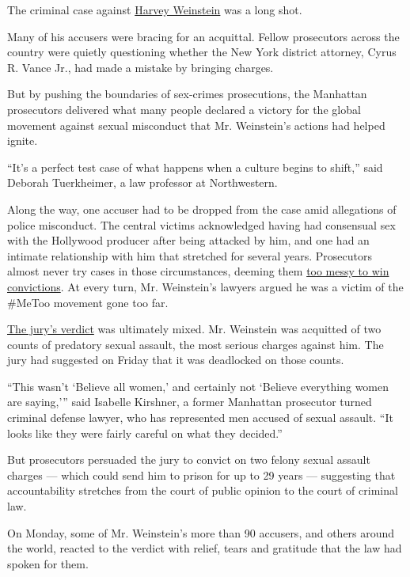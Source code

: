 The criminal case against
\href{https://www.nytimes3xbfgragh.onion/2020/02/25/us/politics/trump-weinstein-verdict.html}{Harvey
Weinstein} was a long shot.

Many of his accusers were bracing for an acquittal. Fellow prosecutors
across the country were quietly questioning whether the New York
district attorney, Cyrus R. Vance Jr., had made a mistake by bringing
charges.

But by pushing the boundaries of sex-crimes prosecutions, the Manhattan
prosecutors delivered what many people declared a victory for the global
movement against sexual misconduct that Mr. Weinstein's actions had
helped ignite.

``It's a perfect test case of what happens when a culture begins to
shift,'' said Deborah Tuerkheimer, a law professor at Northwestern.

Along the way, one accuser had to be dropped from the case amid
allegations of police misconduct. The central victims acknowledged
having had consensual sex with the Hollywood producer after being
attacked by him, and one had an intimate relationship with him that
stretched for several years. Prosecutors almost never try cases in those
circumstances, deeming them
\href{https://www.nytimes3xbfgragh.onion/2020/02/07/nyregion/harvey-weinstein-trial-consent.html}{too
messy to win convictions}. At every turn, Mr. Weinstein's lawyers argued
he was a victim of the \#MeToo movement gone too far.

\href{https://www.nytimes3xbfgragh.onion/2020/02/24/nyregion/harvey-weinstein-trial-rape-verdict.html}{The
jury's verdict} was ultimately mixed. Mr. Weinstein was acquitted of two
counts of predatory sexual assault, the most serious charges against
him. The jury had suggested on Friday that it was deadlocked on those
counts.

``This wasn't `Believe all women,' and certainly not `Believe everything
women are saying,''' said Isabelle Kirshner, a former Manhattan
prosecutor turned criminal defense lawyer, who has represented men
accused of sexual assault. ``It looks like they were fairly careful on
what they decided.''

But prosecutors persuaded the jury to convict on two felony sexual
assault charges --- which could send him to prison for up to 29 years
--- suggesting that accountability stretches from the court of public
opinion to the court of criminal law.

On Monday, some of Mr. Weinstein's more than 90 accusers, and others
around the world, reacted to the verdict with relief, tears and
gratitude that the law had spoken for them.

